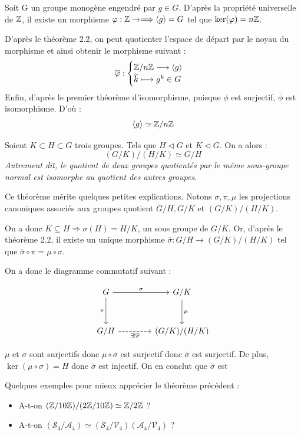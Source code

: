 \begin{remark}
	Soit G un groupe monogène engendré par $g \in G$. 
	D'après la propriété universelle de $\mathbb{Z}$, il existe un morphisme $\varphi : \mathbb{Z} \to \Longrightarrow \langle g \rangle= G$ tel que $\ker(\varphi) = n\mathbb{Z}$. 
	
	D'après le théorème 2.2, on peut quotienter l'espace de départ par le noyau du morphisme et ainsi obtenir le morphisme suivant :
		\[ \overline{\varphi} :
			\begin{cases}
				\mathbb{Z}/n\mathbb{Z} \longrightarrow \langle g \rangle \\ 
				\overline{k} \longmapsto g^k \in G 
			\end{cases}
		\] 
	Enfin, d'après le premier théorème d'isomorphisme, puisque $\phi$ est surjectif, $\overline{\phi}$ est isomorphisme. 
	D'où : $$ \langle g \rangle \simeq \mathbb{Z}/n\mathbb{Z} $$  
\end{remark}

\begin{theorem}
	Soient $K \subset H \subset G$ trois groupes. Tels que $H \triangleleft G$ et $ K \triangleleft G$. On a alors :
		\[ (G/K)/(H/K) \simeq G/H \] 
	\emph{Autrement dit, le quotient de deux groupes quotientés par le même sous-groupe normal est isomorphe au quotient des autres groupes.}
\end{theorem}

Ce théorème mérite quelques petites explications. Notons $\sigma, \pi, \mu$ les projections canoniques associés aux groupes quotient $G/H, G/K$ et $(G/K)/(H/K)$. 

On a donc $K \subseteq H \Longrightarrow \sigma(H) = H/K$, un sous groupe de $G/K$. 
Or, d'après le théorème 2.2, il existe un unique morphisme $\overline{\sigma} : G/H \longrightarrow (G/K)/(H/K)$ tel que $\overline{\sigma} \circ \pi = \mu \circ \sigma$. 

\vspace{0.3cm}

On a donc le diagramme commutatif suivant : 

	\[
	\begin{tikzcd}[scale=1.5, row sep=3em, column sep=4em]
		G \arrow[r, "\sigma"] \arrow[d, "\pi" swap] & G/K \arrow[d, "\mu"] \\
		G/H \arrow[r, "\exists ! \overline{\sigma}" swap, dashed] & (G/K)/(H/K)
	\end{tikzcd}
	\]

$\mu$ et $\sigma$ sont surjectifs donc $\mu \circ \sigma$ est surjectif donc $\overline{\sigma}$ est surjectif. 
De plus, $\ker(\mu \circ \sigma) = H$ donc $\overline{\sigma}$ est injectif. On en conclut que $\overline{\sigma}$ est 

\begin{example}
	Quelques exemples pour mieux apprécier le théorème précédent :
	\begin{itemize}
		\item A-t-on $(\mathbb{Z}/10\mathbb{Z})/(2\mathbb{Z}/10\mathbb{Z}) \simeq \mathbb{Z}/2\mathbb{Z}$ ? 
		\item A-t-on $(\mathcal{S}_4/\mathcal{A}_4) \simeq (\mathcal{S}_4/\mathcal{V}_4)(\mathcal{A}_4/\mathcal{V}_4)$ ?
	\end{itemize}
\end{example}